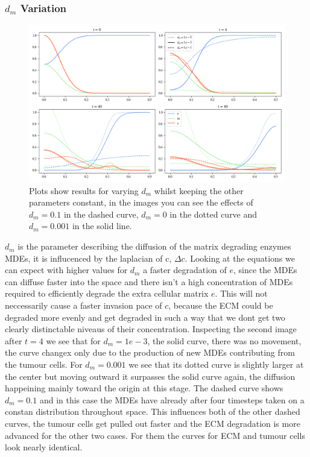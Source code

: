 \subsubsection*{$d_m$ Variation}
\begin{figure}[h]
    \centering
    \includegraphics[width=\textwidth]{resources/images/dm_variation.png}
    \caption{Plots show results for varying $d_m$ whilst keeping the other parameters constant, in the images you can see the effects of $d_m=0.1$ in the dashed curve, $d_m=0$ in the dotted curve and $d_m=0.001$ in the solid line.}
    \label{fig:dm_variation}
\end{figure}
$d_m$ is the parameter describing the diffusion of the matrix degrading enzymes MDEs, it is influcenced by the laplacian of c, $\Delta c$. Looking at the equations we can expect with higher values for $d_m$ a faster degradation of $e$, since the MDEs can diffuse faster into the space and there isn't a high concentration of MDEs required to efficiently degrade the extra cellular matrix $e$. This will not neccessarily cause a faster invasion pace of $c$, because the ECM could be degraded more evenly and get degraded in such a way that we dont get two clearly distinctable niveaus of their concentration.
Inspecting the second image after $t=4$ we see that for $d_m=1e-3$, the solid curve, there was no movement, the curve changex only due to the production of new MDEs contributing from the tumour cells. For $d_m=0.001$ we see that its dotted curve is slightly larger at the center but moving outward it surpasses the solid curve again, the diffusion happeining mainly toward the origin at this stage. The dashed curve shows $d_m=0.1$ and in this case the MDEs have already after four timesteps taken on a constan distribution throughout space. This influences both of the other dashed curves, the tumour cells get pulled out faster and the ECM degradation is more advanced for the other two cases. For them the curves for ECM and tumour cells look nearly identical.
